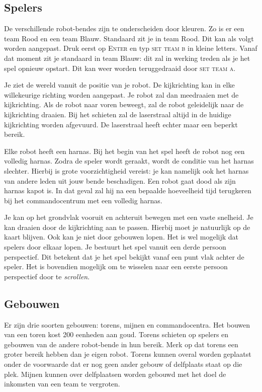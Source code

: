     \subsection{Spelers}
    De verschillende robot-bendes zijn te onderscheiden door kleuren. Zo is er een team Rood en een team Blauw. Standaard zit je in team Rood. Dit kan als volgt worden aangepast. Druk eerst op \textsc{Enter} en typ \textsc{set team b} in kleine letters. Vanaf dat moment zit je standaard in team Blauw: dit zal in werking treden als je het spel opnieuw opstart. Dit kan weer worden teruggedraaid door \textsc{set team a}.

    Je ziet de wereld vanuit de positie van je robot. De kijkrichting kan in elke willekeurige richting worden aangepast. Je robot zal dan meedraaien met de kijkrichting. Als de robot naar voren beweegt, zal de robot geleidelijk naar de kijkrichting draaien. Bij het schieten zal de laserstraal altijd in de huidige kijkrichting worden afgevuurd. De laserstraal heeft echter maar een beperkt bereik.

    Elke robot heeft een harnas. Bij het begin van het spel heeft de robot nog een volledig harnas. Zodra de speler wordt geraakt, wordt de conditie van het harnas slechter. Hierbij is grote voorzichtigheid vereist: je kan namelijk ook het harnas van andere leden uit jouw bende beschadigen. Een robot gaat dood als zijn harnas kapot is. In dat geval zal hij na een bepaalde hoeveelheid tijd terugkeren bij het commandocentrum met een volledig harnas.

    Je kan op het grondvlak vooruit en achteruit bewegen met een vaste snelheid. Je kan draaien door de kijkrichting aan te passen. Hierbij moet je natuurlijk op de kaart blijven. Ook kan je niet door gebouwen lopen. Het is wel mogelijk dat spelers door elkaar lopen. Je bestuurt het spel vanuit een derde persoon perspectief. Dit betekent dat je het spel bekijkt vanaf een punt vlak achter de speler. Het is bovendien mogelijk om te wisselen naar een eerste persoon perspectief door te \emph{scrollen}.

    \subsection{Gebouwen}
    Er zijn drie soorten gebouwen: torens, mijnen en commandocentra. Het bouwen van een toren kost 200 eenheden aan goud. Torens schieten op spelers en gebouwen van de andere robot-bende in hun bereik. Merk op dat torens een groter bereik hebben dan je eigen robot. Torens kunnen overal worden geplaatst onder de voorwaarde dat er nog geen ander gebouw of delfplaats staat op die plek. Mijnen kunnen over delfplaatsen worden gebouwd met het doel de inkomsten van een team te vergroten.

